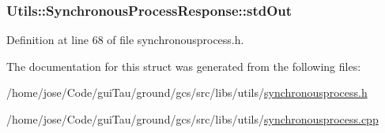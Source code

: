 \hypertarget{struct_utils_1_1_synchronous_process_response_a84040de73bca35b34e0d0f0069c849b5}{
\subsubsection[{std\-Out}]{ Utils\-::\-Synchronous\-Process\-Response\-::std\-Out}}\label{struct_utils_1_1_synchronous_process_response_a84040de73bca35b34e0d0f0069c849b5}


Definition at line 68 of file synchronousprocess.\-h.



The documentation for this struct was generated from the following files\-:\begin{DoxyCompactItemize}
\item 
/home/jose/\-Code/gui\-Tau/ground/gcs/src/libs/utils/\hyperlink{synchronousprocess_8h}{synchronousprocess.\-h}\item 
/home/jose/\-Code/gui\-Tau/ground/gcs/src/libs/utils/\hyperlink{synchronousprocess_8cpp}{synchronousprocess.\-cpp}\end{DoxyCompactItemize}
